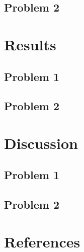 \documentclass[12pt]{article}
\begin{document}
\subsection{Problem 2}

\section{Results} %

\subsection{Problem 1}


\subsection{Problem 2}

\section{Discussion} %

\subsection{Problem 1}

\subsection{Problem 2}

\section{References} %
\end{document}
